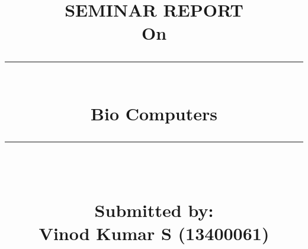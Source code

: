 
%
%
%
% 
%
%

\documentclass[23pt]{article}
\usepackage[margin=1in, paperwidth=21cm, paperheight=29.7cm]{geometry}
\usepackage[pdftex]{color,graphicx}
\usepackage[english]{babel}
\usepackage[utf8x]{inputenc}
\usepackage{amsmath}
\usepackage[colorinlistoftodos]{todonotes}
\usepackage{cite}
\usepackage{listings}
\usepackage[nodayofweek]{datetime}
\usepackage{setspace}
\usepackage{fancyhdr}
\usepackage{tabu}
\newcommand{\HRule}{\rule{\linewidth}{0.5mm}}
\newcommand{\abbrlabel}[1]{\makebox[5cm][l]{\textbf{#1}\ \dotfill}}
\newenvironment{abbreviations}{\begin{list}{}{\renewcommand{\makelabel}{\abbrlabel}}}{\end{list}}

\nocite{*}
\title{\begin{center}
\bf SEMINAR REPORT\\
\vspace{0.5cm} On\\
\HRule \\[0.4cm]
{ \huge \bfseries Bio Computers}\\[0.4cm] %
\HRule \\[0.4 cm]
\vspace{0.5cm} \begin{Large} Submitted by:\\ 
\vspace{.35cm}Vinod Kumar S (13400061)
\end{Large}
\end{center}}
\vspace{.5cm}
\date{}

